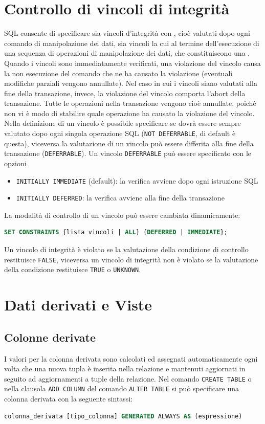 \documentclass[12pt, a4paper]{report}
\begin{document}
    \section{Controllo di vincoli di integrità}\label{sec:5.9}
    SQL consente di specificare sia vincoli d'integrità con , cioè valutati dopo ogni comando di manipolazione dei dati, sia vincoli la cui  al termine dell'esecuzione di una sequenza di operazioni di manipolazione dei dati, che constituiscono una . Quando i vincoli sono immediatamente verificati, una violazione del vincolo causa la non esecuzione del comando che ne ha causato la violazione (eventuali modifiche parziali vengono annullate). Nel caso in cui i vincoli siano valutati alla fine della transazione, invece, la violazione del vincolo comporta l'abort della transazione. Tutte le operazioni nella transazione vengono cioè annullate, poichè non vi è modo di stabilire quale operazione ha causato la violazione del vincolo.\\
    Nella definizione di un vincolo è possibile specificare se dovrà essere sempre valutato dopo ogni singola operazione SQL (\texttt{NOT DEFERRABLE}, di default è questa), viceversa  la valutazione di un vincolo può essere differita alla fine della transazione (\texttt{DEFERRABLE}). Un vincolo \texttt{DEFERRABLE} può essere specificato con le opzioni
    \begin{itemize}
        \item \texttt{INITIALLY IMMEDIATE} (default): la verifica avviene dopo ogni istruzione SQL 
        \item \texttt{INITIALLY DEFERRED}: la verifica avviene alla fine della transazione
    \end{itemize}
    La modalità di controllo di un vincolo può essere cambiata dinamicamente:
    \begin{lstlisting}[language=SQL]
        SET CONSTRAINTS {lista vincoli | ALL} {DEFERRED | IMMEDIATE};
    \end{lstlisting} 
    Un vincolo di integrità è violato se la valutazione della condizione di controllo restituisce \texttt{FALSE}, viceversa un vincolo di integrità non è violato se la valutazione della condizione restituisce \texttt{TRUE} o \texttt{UNKNOWN}.
    \section{Dati derivati e Viste}
    \subsection{Colonne derivate}
    I valori per la colonna derivata sono calcolati ed assegnati automaticamente ogni volta che una nuova tupla è inserita nella relazione e mantenuti aggiornati in seguito ad aggiornamenti a tuple della relazione. Nel comando \texttt{CREATE TABLE} o nella clausola \texttt{ADD COLUMN} del comando \texttt{ALTER TABLE} si può specificare una colonna derivata con la seguente sintassi:
    \begin{lstlisting}[language=SQL]
        colonna_derivata [tipo_colonna] GENERATED ALWAYS AS (espressione)
    \end{lstlisting}
\end{document}
